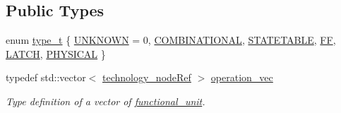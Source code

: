 \subsection*{Public Types}
\begin{DoxyCompactItemize}
\item 
enum \hyperlink{structfunctional__unit_abf715beb1f09a03995234a68c1478bfe}{type\+\_\+t} \{ \newline
\hyperlink{structfunctional__unit_abf715beb1f09a03995234a68c1478bfea4a3a4124931164e3da94ce4c90f0f120}{U\+N\+K\+N\+O\+WN} = 0, 
\hyperlink{structfunctional__unit_abf715beb1f09a03995234a68c1478bfeac56098adc0a04cfbda6bf66913e0f01f}{C\+O\+M\+B\+I\+N\+A\+T\+I\+O\+N\+AL}, 
\hyperlink{structfunctional__unit_abf715beb1f09a03995234a68c1478bfea4798b7e0399178261ac4873ab14f2626}{S\+T\+A\+T\+E\+T\+A\+B\+LE}, 
\hyperlink{structfunctional__unit_abf715beb1f09a03995234a68c1478bfeac93a0241d049c83607bb27a937b486ab}{FF}, 
\newline
\hyperlink{structfunctional__unit_abf715beb1f09a03995234a68c1478bfeaa265d41af486d86fdcb2f1dfdc533768}{L\+A\+T\+CH}, 
\hyperlink{structfunctional__unit_abf715beb1f09a03995234a68c1478bfea7be041265d3ebfa9b8750cf157ccf89a}{P\+H\+Y\+S\+I\+C\+AL}
 \}
\item 
typedef std\+::vector$<$ \hyperlink{technology__node_8hpp_a33dd193b7bd6b987bf0d8a770a819fa7}{technology\+\_\+node\+Ref} $>$ \hyperlink{structfunctional__unit_a95afca234ddcc2e13d56d6e5eb53557a}{operation\+\_\+vec}
\begin{DoxyCompactList}\small\item\em Type definition of a vector of \hyperlink{structfunctional__unit}{functional\+\_\+unit}. \end{DoxyCompactList}\end{DoxyCompactItemize}
